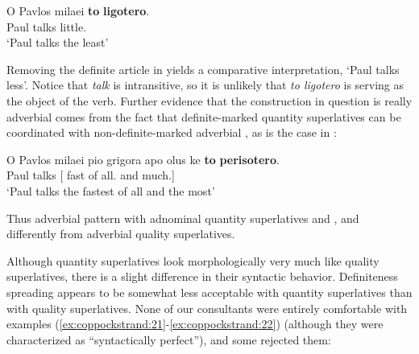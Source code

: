 \documentclass[output=paper
,modfonts
,nonflat]{langsci/langscibook}
\begin{document}
\ea \label{ex:coppockstrand:19} 
\gll O Pavlos milaei \textbf{to} \textbf{ligotero}.\\
  Paul talks   little.\cmpr{}\\
\glt `Paul talks the least'
\z

Removing the definite article in  yields a comparative interpretation, `Paul talks less'. Notice that \textit{talk} is intransitive, so it is unlikely that \textit{to ligotero} is serving as the object of the verb. Further evidence that the construction in question is really adverbial comes from the fact that definite-marked quantity superlatives can be coordinated with non-definite-marked adverbial , as is the case in :

\ea \label{ex:coppockstrand:20}
\gll O Pavlos milaei {\ob}pio grigora apo olus ke \textbf{to} \textbf{perisotero}{\cb}.\\
 Paul talks [\cmpr{} fast of all.\acc{} and   much.\cmpr{}]\\
\glt `Paul talks the fastest of all and the most'
\z

Thus adverbial  pattern with adnominal quantity superlatives and , and differently from adverbial quality superlatives.

Although quantity superlatives look morphologically very much like quality superlatives, there is a slight difference in their syntactic behavior.
Definiteness spreading appears to be somewhat less acceptable with quantity superlatives than with quality superlatives. None of our consultants were entirely comfortable with examples (\ref{ex:coppockstrand:21}-\ref{ex:coppockstrand:22}) (although they were characterized as ``syntactically perfect''), and some rejected them:

\ea \label{ex:coppockstrand:21}
\begin{xlist}
\end{xlist}
\z
\end{document}
